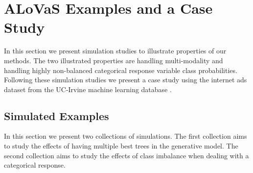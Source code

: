 \section{ALoVaS Examples and a Case Study}\label{sec:Examples}

In this section we present simulation studies to illustrate properties of our methods. The two illustrated properties are handling multi-modality and handling highly non-balanced categorical response variable class probabilities. Following these simulation studies we present a case study using the internet ads dataset from the UC-Irvine machine learning database \cite{Frank:2010uq}. 

	\subsection{Simulated Examples}
	In this section we present two collections of simulations. The first collection aims to study the effects of having multiple best trees in the generative model. The second collection aims to study the effects of class imbalance when dealing with a categorical response. 
	
